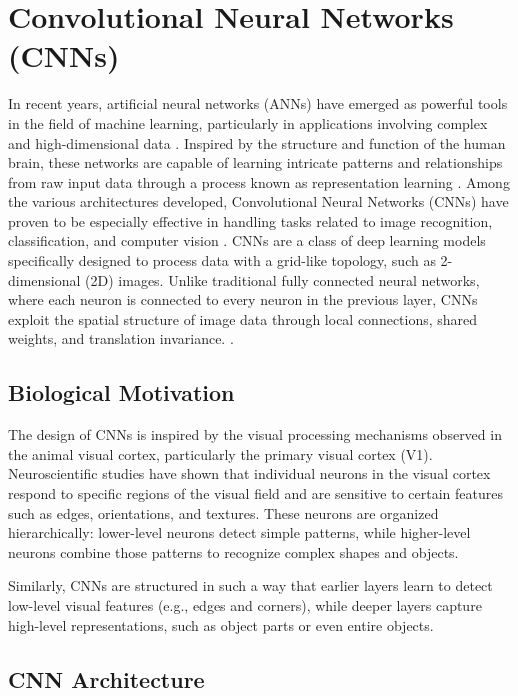 \section{Convolutional Neural Networks (CNNs)}

In recent years, artificial neural networks (ANNs) have emerged as powerful tools in the field of machine learning, particularly in applications involving complex and high-dimensional data  \cite{lecun2015deep}. Inspired by the structure and function of the human brain, these networks are capable of learning intricate patterns and relationships from raw input data through a process known as representation learning  \cite{bengio2013representation}. Among the various architectures developed, Convolutional Neural Networks (CNNs) have proven to be especially effective in handling tasks related to image recognition, classification, and computer vision \cite{krizhevsky2017imagenet, yamashita2018convolutional}.
CNNs are a class of deep learning models specifically designed to process data with a grid-like topology, such as 2-dimensional (2D) images. Unlike traditional fully connected neural networks, where each neuron is connected to every neuron in the previous layer, CNNs exploit the spatial structure of image data through local connections, shared weights, and translation invariance. \cite{yamashita2018convolutional}.


\subsection{Biological Motivation}
The design of CNNs is inspired by the visual processing mechanisms observed in the animal visual cortex, particularly the primary visual cortex (V1). Neuroscientific studies have shown that individual neurons in the visual cortex respond to specific regions of the visual field and are sensitive to certain features such as edges, orientations, and textures. These neurons are organized hierarchically: lower-level neurons detect simple patterns, while higher-level neurons combine those patterns to recognize complex shapes and objects.

Similarly, CNNs are structured in such a way that earlier layers learn to detect low-level visual features (e.g., edges and corners), while deeper layers capture high-level representations, such as object parts or even entire objects.


\subsection{CNN Architecture}

